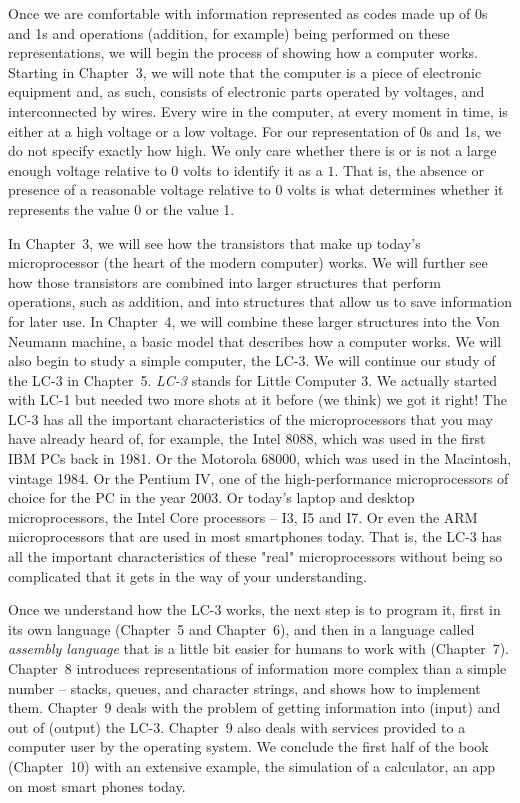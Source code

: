 \documentclass{patt}
\begin{document}
Once we are comfortable with information represented as codes
made up of 0s and 1s and operations (addition, for example)
being performed on these representations, we will begin the
process of showing how a computer works.  Starting in Chapter~3, we will
note that the computer is a piece of electronic equipment and, as such,
consists of electronic parts operated by voltages, 
and interconnected by wires.
Every wire in the computer, at every moment in time, is
either at a high voltage or a low voltage. For our representation of 0s 
and 1s, we do not specify exactly how high. 
We only care whether there is or is not a large enough voltage relative 
to 0 volts to identify it as a $1$.  That is, the absence or
presence of a reasonable voltage relative to 0 volts is what determines 
whether it represents the value 0 or the value 1.

In Chapter~3, we will
see how the transistors that make up today's microprocessor (the heart of 
the modern computer) works.  We will further see how those transistors 
are combined into larger structures that perform operations, such as addition,
and into structures that allow us to save information for later
use.  In Chapter~4, we will combine these larger structures into
the Von Neumann machine, a basic model that describes how a
computer works.  We will also begin to study a simple
computer, the LC-3.  We will continue our study of the LC-3 in
Chapter~5.  {\em LC-3} stands for Little Computer 3.  We actually started
with LC-1 but needed two more shots at it before (we think)
we got it right!  The LC-3 has all the important characteristics of
the microprocessors that you may have already heard of, for
example, the Intel 8088, which was used in the first IBM PCs
back in 1981.  Or the Motorola 68000, which was used in the
Macintosh, vintage 1984.  Or the Pentium IV, one of the
high-performance microprocessors of choice for the PC in the
year 2003. Or today's laptop and desktop microprocessors, the Intel Core 
processors -- I3, I5 and I7.   Or even the ARM microprocessors that are 
used in most smartphones today.  That is,
the LC-3 has all the important characteristics of these "real"
microprocessors without being so complicated that it gets in
the way of your understanding.

Once we understand how the LC-3 works, the next step is to
program it, first in its own language (Chapter~5 and Chapter~6), and
then in a language called {\em assembly language} that is a little
bit easier for humans to work with (Chapter~7).  Chapter~8 introduces 
representations of information more complex than a simple number -- stacks, 
queues, and character strings, and shows how to implement them. 
Chapter~9 deals with the problem of getting information into (input)
and out of (output) the LC-3.  Chapter~9 also deals with services provided 
to a computer user by the operating system.  We conclude the first half of 
the book (Chapter~10) with an extensive example, the simulation of a 
calculator, an app on most smart phones today.
\end{document}
